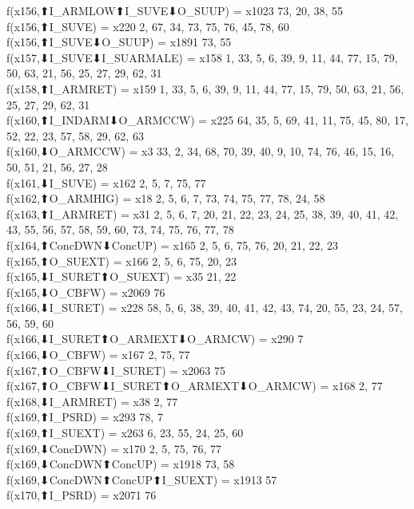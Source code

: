 f(x156,⬆I_ARMLOW⬆I_SUVE⬇O_SUUP) = x1023 {73, 20, 38, 55} \\
f(x156,⬆I_SUVE) = x220 {2, 67, 34, 73, 75, 76, 45, 78, 60} \\
f(x156,⬆I_SUVE⬇O_SUUP) = x1891 {73, 55} \\
f(x157,⬇I_SUVE⬇I_SUARMALE) = x158 {1, 33, 5, 6, 39, 9, 11, 44, 77, 15, 79, 50, 63, 21, 56, 25, 27, 29, 62, 31} \\
f(x158,⬆I_ARMRET) = x159 {1, 33, 5, 6, 39, 9, 11, 44, 77, 15, 79, 50, 63, 21, 56, 25, 27, 29, 62, 31} \\
f(x160,⬆I_INDARM⬇O_ARMCCW) = x225 {64, 35, 5, 69, 41, 11, 75, 45, 80, 17, 52, 22, 23, 57, 58, 29, 62, 63} \\
f(x160,⬇O_ARMCCW) = x3 {33, 2, 34, 68, 70, 39, 40, 9, 10, 74, 76, 46, 15, 16, 50, 51, 21, 56, 27, 28} \\
f(x161,⬇I_SUVE) = x162 {2, 5, 7, 75, 77} \\
f(x162,⬆O_ARMHIG) = x18 {2, 5, 6, 7, 73, 74, 75, 77, 78, 24, 58} \\
f(x163,⬆I_ARMRET) = x31 {2, 5, 6, 7, 20, 21, 22, 23, 24, 25, 38, 39, 40, 41, 42, 43, 55, 56, 57, 58, 59, 60, 73, 74, 75, 76, 77, 78} \\
f(x164,⬆ConcDWN⬇ConcUP) = x165 {2, 5, 6, 75, 76, 20, 21, 22, 23} \\
f(x165,⬆O_SUEXT) = x166 {2, 5, 6, 75, 20, 23} \\
f(x165,⬇I_SURET⬆O_SUEXT) = x35 {21, 22} \\
f(x165,⬇O_CBFW) = x2069 {76} \\
f(x166,⬇I_SURET) = x228 {58, 5, 6, 38, 39, 40, 41, 42, 43, 74, 20, 55, 23, 24, 57, 56, 59, 60} \\
f(x166,⬇I_SURET⬆O_ARMEXT⬇O_ARMCW) = x290 {7} \\
f(x166,⬇O_CBFW) = x167 {2, 75, 77} \\
f(x167,⬆O_CBFW⬇I_SURET) = x2063 {75} \\
f(x167,⬆O_CBFW⬇I_SURET⬆O_ARMEXT⬇O_ARMCW) = x168 {2, 77} \\
f(x168,⬇I_ARMRET) = x38 {2, 77} \\
f(x169,⬆I_PSRD) = x293 {78, 7} \\
f(x169,⬆I_SUEXT) = x263 {6, 23, 55, 24, 25, 60} \\
f(x169,⬇ConcDWN) = x170 {2, 5, 75, 76, 77} \\
f(x169,⬇ConcDWN⬆ConcUP) = x1918 {73, 58} \\
f(x169,⬇ConcDWN⬆ConcUP⬆I_SUEXT) = x1913 {57} \\
f(x170,⬆I_PSRD) = x2071 {76} \\
